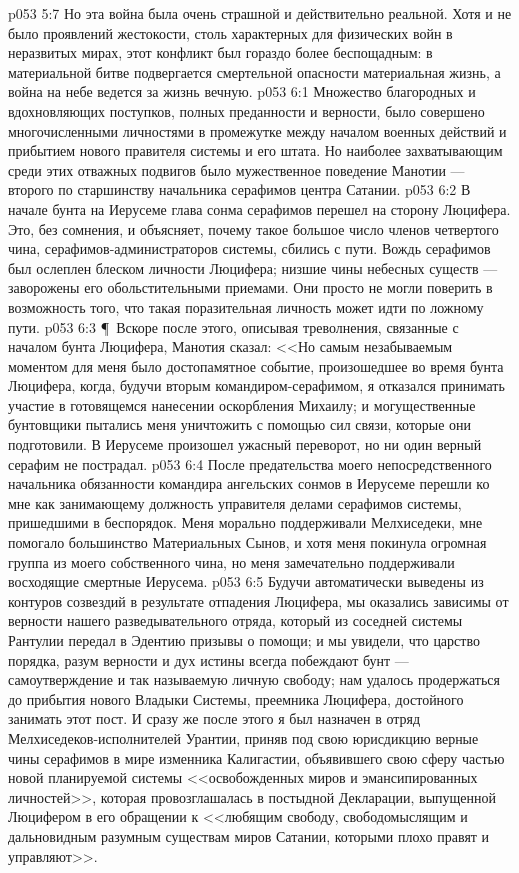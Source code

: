 \vs p053 5:7 Но эта война была очень страшной и действительно реальной. Хотя и не было проявлений жестокости, столь характерных для физических войн в неразвитых мирах, этот конфликт был гораздо более беспощадным: в материальной битве подвергается смертельной опасности материальная жизнь, а война на небе ведется за жизнь вечную.
\vs p053 6:1 Множество благородных и вдохновляющих поступков, полных преданности и верности, было совершено многочисленными личностями в промежутке между началом военных действий и прибытием нового правителя системы и его штата. Но наиболее захватывающим среди этих отважных подвигов было мужественное поведение Манотии --- второго по старшинству начальника серафимов центра Сатании.
\vs p053 6:2 В начале бунта на Иерусеме глава сонма серафимов перешел на сторону Люцифера. Это, без сомнения, и объясняет, почему такое большое число членов четвертого чина, серафимов\hyp{}администраторов системы, сбились с пути. Вождь серафимов был ослеплен блеском личности Люцифера; низшие чины небесных существ --- заворожены его обольстительными приемами. Они просто не могли поверить в возможность того, что такая поразительная личность может идти по ложному пути.
\vs p053 6:3 \P\ Вскоре после этого, описывая треволнения, связанные с началом бунта Люцифера, Манотия сказал: <<Но самым незабываемым моментом для меня было достопамятное событие, произошедшее во время бунта Люцифера, когда, будучи вторым командиром\hyp{}серафимом, я отказался принимать участие в готовящемся нанесении оскорбления Михаилу; и могущественные бунтовщики пытались меня уничтожить с помощью сил связи, которые они подготовили. В Иерусеме произошел ужасный переворот, но ни один верный серафим не пострадал.
\vs p053 6:4 После предательства моего непосредственного начальника обязанности командира ангельских сонмов в Иерусеме перешли ко мне как занимающему должность управителя делами серафимов системы, пришедшими в беспорядок. Меня морально поддерживали Мелхиседеки, мне помогало большинство Материальных Сынов, и хотя меня покинула огромная группа из моего собственного чина, но меня замечательно поддерживали восходящие смертные Иерусема.
\vs p053 6:5 Будучи автоматически выведены из контуров созвездий в результате отпадения Люцифера, мы оказались зависимы от верности нашего разведывательного отряда, который из соседней системы Рантулии передал в Эдентию призывы о помощи; и мы увидели, что царство порядка, разум верности и дух истины всегда побеждают бунт --- самоутверждение и так называемую личную свободу; нам удалось продержаться до прибытия нового Владыки Системы, преемника Люцифера, достойного занимать этот пост. И сразу же после этого я был назначен в отряд Мелхиседеков\hyp{}исполнителей Урантии, приняв под свою юрисдикцию верные чины серафимов в мире изменника Калигастии, объявившего свою сферу частью новой планируемой системы <<освобожденных миров и эмансипированных личностей>>, которая провозглашалась в постыдной Декларации, выпущенной Люцифером в его обращении к <<любящим свободу, свободомыслящим и дальновидным разумным существам миров Сатании, которыми плохо правят и управляют>>.
